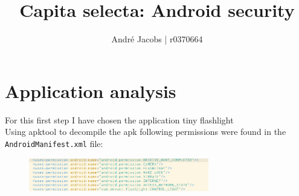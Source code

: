 \documentclass[10pt,a4paper]{article}
\author{André Jacobs | r0370664}
\title{Capita selecta: Android security}
\begin{document}
\maketitle

\section{Application analysis}
For this first step I have chosen the application tiny flashlight
\cite{playlink1}\cite{apklink1}\\
Using apktool to decompile the apk following permissions were found in the
\texttt{AndroidManifest.xml} file:\\
\begin{figure}[h!]
  \includegraphics[width=0.7\textwidth]{manifest1}
\end{figure}
\end{document}

